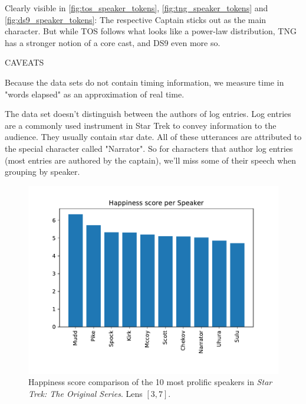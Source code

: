 Clearly visible in \ref{fig:tos_speaker_tokens}, \ref{fig:tng_speaker_tokens} and \ref{fig:ds9_speaker_tokens}: The respective Captain sticks out as the main character. But while TOS follows what looks like a power-law distribution, TNG has a stronger notion of a core cast, and DS9 even more so.

CAVEATS

Because the data sets do not contain timing information, we measure time in "words elapsed" as an approximation of real time.

The data set doesn't distinguish between the authors of log entries. Log entries are a commonly used instrument in Star Trek to convey information to the audience. They usually contain star date. All of these utterances are attributed to the special character called "Narrator". So for characters that author log entries (most entries are authored by the captain), we'll miss some of their speech when grouping by speaker.

\begin{figure}
  \centering
  \includegraphics[width=\columnwidth]{figures/localized/tos_speaker_happiness_scores.pdf}
  \caption{Happiness score comparison of the 10 most prolific speakers in \textit{Star Trek: The Original Series}. Lens $[3, 7]$.}
  \label{fig:tos_happiness}
\end{figure}

